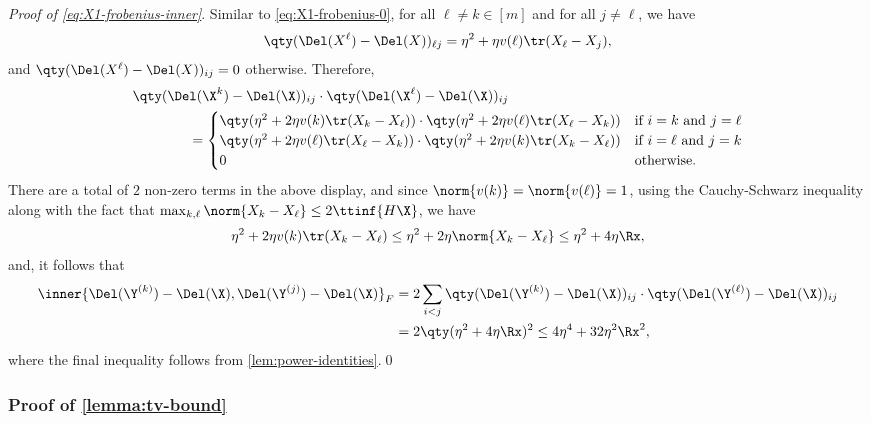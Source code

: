 \documentclass[10pt]{article}
\begin{document}
\noindent\textit{Proof of \ref{eq:X1-frobenius-inner}}.\quad
Similar to \cref{eq:X1-frobenius-0}, for all $\ell \neq k \in [m]$ and for all $j \neq \ell$, we have
\begin{align}
    \qty(\Del(X^\ell) - \Del(X))_{\ell j} = \eta^2 + \eta v(\ell)\tr(X_\ell-X_j),
\end{align}
and $\qty(\Del(X^\ell) - \Del(X))_{ij} = 0$ otherwise. Therefore,
\begin{align}
    &\qty(\Del(\X^{k}) - \Del(\X))_{ij} \cdot \qty(\Del(\X^{\ell}) - \Del(\X))_{ij}\\ 
    &\qquad\qquad= 
    \begin{cases}
        \qty(\eta^2 + 2\eta v(k)\tr(X_k - X_\ell)) \cdot \qty(\eta^2 + 2\eta v(\ell)\tr(X_\ell - X_k)) & \text{if } i=k \text{ and } j=\ell\\
        \qty(\eta^2 + 2\eta v(\ell)\tr(X_\ell - X_k)) \cdot \qty(\eta^2 + 2\eta v(k)\tr(X_k - X_\ell)) & \text{if } i=\ell \text{ and } j=k\\
        0 & \text{otherwise}.
    \end{cases}
\end{align}
There are a total of $2$ non-zero terms in the above display, and since $\norm{v(k)} = \norm{v(\ell)}=1$, using the Cauchy-Schwarz inequality along with the fact that $\max_{k, \ell}\norm{X_k - X_\ell}\le 2\ttinf{H\X}$, we have
$$
\eta^2 + 2\eta v(k)\tr(X_k - X_\ell) \le \eta^2 + 2\eta \norm{X_k - X_\ell} \le \eta^2 + 4\eta \Rx,
$$
and, it follows that
\begin{align}
    \inner{ \Del(\Y^{(k)}) - \Del(\X),  \Del(\Y^{(j)}) - \Del(\X)}_F 
    &= 2\sum_{i < j} \qty(\Del(\Y^{(k)}) - \Del(\X))_{ij} \cdot \qty(\Del(\Y^{(\ell)}) - \Del(\X))_{ij}\\
    &= 2\qty(\eta^2 + 4\eta\Rx)^2 \le 4\eta^4 + 32\eta^2\Rx^2,
\end{align}
where the final inequality follows from \cref{lem:power-identities}.\qed












\subsubsection{Proof of \cref{lemma:tv-bound}}
\label{proof:lemma:tv-bound}
\end{document}
